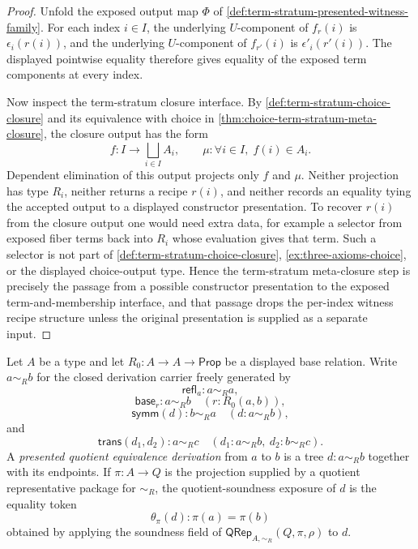 \begin{proof}
Unfold the exposed output map $\Phi$ of \autoref{def:term-stratum-presented-witness-family}. For each index $i\in I$, the underlying $U$-component of $f_r(i)$ is $\epsilon_i(r(i))$, and the underlying $U$-component of $f_{r'}(i)$ is $\epsilon'_i(r'(i))$. The displayed pointwise equality therefore gives equality of the exposed term components at every index.

Now inspect the term-stratum closure interface. By \autoref{def:term-stratum-choice-closure} and its equivalence with choice in \autoref{thm:choice-term-stratum-meta-closure}, the closure output has the form
$$
f:I\to\bigsqcup_{i\in I}A_i,
\qquad
\mu:\forall i\in I,\;f(i)\in A_i.
$$
Dependent elimination of this output projects only $f$ and $\mu$. Neither projection has type $R_i$, neither returns a recipe $r(i)$, and neither records an equality tying the accepted output to a displayed constructor presentation. To recover $r(i)$ from the closure output one would need extra data, for example a selector from exposed fiber terms back into $R_i$ whose evaluation gives that term. Such a selector is not part of \autoref{def:term-stratum-choice-closure}, \autoref{ex:three-axioms-choice}, or the displayed choice-output type. Hence the term-stratum meta-closure step is precisely the passage from a possible constructor presentation to the exposed term-and-membership interface, and that passage drops the per-index witness recipe structure unless the original presentation is supplied as a separate input.
\end{proof}


\begin{definition}
\label{def:presented-quotient-equivalence-derivation}
Let $A$ be a type and let $R_0:A\to A\to\mathsf{Prop}$ be a displayed base relation. Write $a\sim_R b$ for the closed derivation carrier freely generated by
$$
\mathsf{refl}_a:a\sim_R a,
$$
$$
\mathsf{base}_r:a\sim_R b\quad(r:R_0(a,b)),
$$
$$
\mathsf{symm}(d):b\sim_R a\quad(d:a\sim_R b),
$$
and
$$
\mathsf{trans}(d_1,d_2):a\sim_R c\quad(d_1:a\sim_R b,\ d_2:b\sim_R c).
$$
A \emph{presented quotient equivalence derivation} from $a$ to $b$ is a tree $d:a\sim_R b$ together with its endpoints. If $\pi:A\to Q$ is the projection supplied by a quotient representative package for $\sim_R$, the quotient-soundness exposure of $d$ is the equality token
$$
\theta_\pi(d):\pi(a)=\pi(b)
$$
obtained by applying the soundness field of $\mathsf{QRep}_{A,\sim_R}(Q,\pi,\rho)$ to $d$.
\end{definition}

